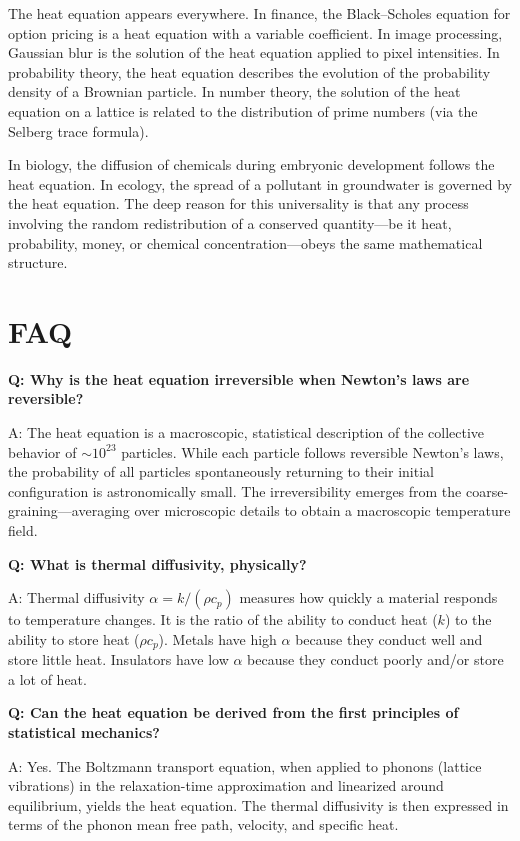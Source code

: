 \documentclass[11pt,openright]{book}
\begin{document}
The heat equation appears everywhere. In finance, the Black--Scholes equation for option pricing is a heat equation with a variable coefficient. In image processing, Gaussian blur is the solution of the heat equation applied to pixel intensities. In probability theory, the heat equation describes the evolution of the probability density of a Brownian particle. In number theory, the solution of the heat equation on a lattice is related to the distribution of prime numbers (via the Selberg trace formula).

In biology, the diffusion of chemicals during embryonic development follows the heat equation. In ecology, the spread of a pollutant in groundwater is governed by the heat equation. The deep reason for this universality is that any process involving the random redistribution of a conserved quantity---be it heat, probability, money, or chemical concentration---obeys the same mathematical structure.

\section*{FAQ}

\textbf{Q: Why is the heat equation irreversible when Newton's laws are reversible?}

A: The heat equation is a macroscopic, statistical description of the collective behavior of $\sim 10^{23}$ particles. While each particle follows reversible Newton's laws, the probability of all particles spontaneously returning to their initial configuration is astronomically small. The irreversibility emerges from the coarse-graining---averaging over microscopic details to obtain a macroscopic temperature field.

\textbf{Q: What is thermal diffusivity, physically?}

A: Thermal diffusivity $\alpha = k/(\rho c_p)$ measures how quickly a material responds to temperature changes. It is the ratio of the ability to conduct heat ($k$) to the ability to store heat ($\rho c_p$). Metals have high $\alpha$ because they conduct well and store little heat. Insulators have low $\alpha$ because they conduct poorly and/or store a lot of heat.

\textbf{Q: Can the heat equation be derived from the first principles of statistical mechanics?}

A: Yes. The Boltzmann transport equation, when applied to phonons (lattice vibrations) in the relaxation-time approximation and linearized around equilibrium, yields the heat equation. The thermal diffusivity is then expressed in terms of the phonon mean free path, velocity, and specific heat.
\end{document}
